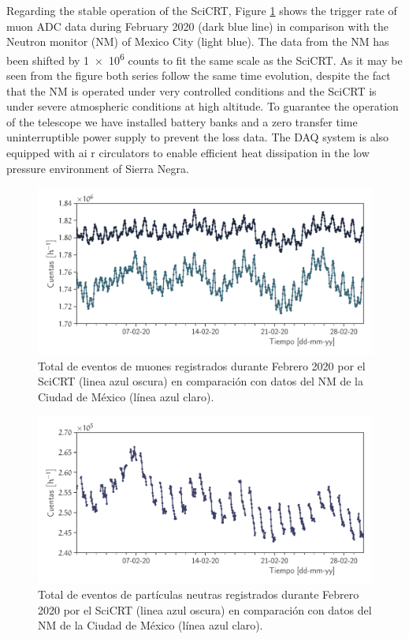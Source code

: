 Regarding the stable operation of the SciCRT, Figure \ref{fig:muon-monthly} shows the trigger rate of muon ADC data during February \num{2020} (dark blue line) in comparison with the Neutron monitor (NM) of Mexico City (light blue). The data from the NM has been shifted by \num{1e6} counts to fit the same scale as the SciCRT. As it may be seen from the figure both series follow the same time evolution, despite the fact that the NM is operated under very controlled conditions and the SciCRT is under severe atmospheric conditions at high altitude. To guarantee the operation of the telescope we have installed battery banks and a zero transfer time uninterruptible power supply to prevent the loss data. The DAQ system is also equipped with ai r circulators to enable efficient heat dissipation in the low pressure environment of Sierra Negra.

\begin{figure}
        \centering
        \includegraphics[width=\textwidth]{muon-monthly.pdf}
        \caption{Total de eventos de muones registrados durante Febrero \num{2020} por el SciCRT (linea azul oscura) en comparación con datos del NM de la Ciudad de México (línea azul claro).}
        \label{fig:muon-monthly}
\end{figure}

\begin{figure}
        \centering
        \includegraphics[width=\textwidth]{neutron-monthly.pdf}
        \caption{Total de eventos de partículas neutras registrados durante Febrero \num{2020} por el SciCRT (linea azul oscura) en comparación con datos del NM de la Ciudad de México (línea azul claro).}
        \label{fig:neutron-monthly}
\end{figure}

